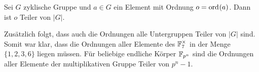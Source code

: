\begin{satz}
    Sei $G$ zyklische Gruppe und $a \in G$ ein Element mit Ordnung $o = \ord{a}$. Dann ist $o$ Teiler von $|G|$.
\end{satz}

Zusätzlich folgt, dass auch die Ordnungen alle Untergruppen Teiler von $|G|$ sind. Somit war klar, dass die Ordnungen aller Elemente des $\field{7}^\times$ in der Menge $\{1,2,3,6\}$ liegen müssen. Für beliebige endliche Körper $\field{p}[n]$ sind die Ordnungen aller Elemente der multiplikativen Gruppe Teiler von $p^n-1$.

\begin{comment}
\begin{enumerate}
    \item Abschnitt Einfache endliche Körper:
    \item Definition: Restklassenring $\mathbb{Z}_n$
    \item Satz: $\mathbb{Z}_n$ ist Ring
    \item Satz: $\mathbb{Z}_p$ ist Körper für $p$ Primzahl
    \item (Satz von Fermat)    
    
    \item Abschnitt Polynomringe:
    \item Definition: Polynom
    \item Satz: Division mit Rest existiert (2.6)
    \item Satz: Polynomringe (${\field{p}}[X]$ und ${\field{p}}_{N} [X]$) sind Ringe    
    
    \item Abschnitt Endliche Körper:
    \item Teiler und Irreduzible Polynome
    \item Satz: ${\field{p}}_{N} [X]$ ist Körper für N irreduzibel (3.7)
    \item Satz: Existenzsatz (10.4)
    \item Satz: Eindeutigkeitssatz (10.9)
    
    \item Abschnitt zyklische Gruppe:
    \item Definition: zyklische Gruppe (6.4)
    \item Satz: Zyklische Gruppe besitzt primitives Element
    \item Potenzgesetze
    \item Satz: Multiplikative Gruppe ${\field{p}}^{\ast}$ und ihre Untergruppen sind zyklisch (7.2)
    \item (Potenzen bilden Untergruppe (6.4))
    \item Definition: Ordnung eines Elements (/ einer Gruppe)
    \item Satz: Potenzen sind zyklisch (6.8)
    \item Satz: Elemente bilden eigene Untergruppe mit Ordnung als Teiler (6.9)
\end{enumerate}
\end{comment}